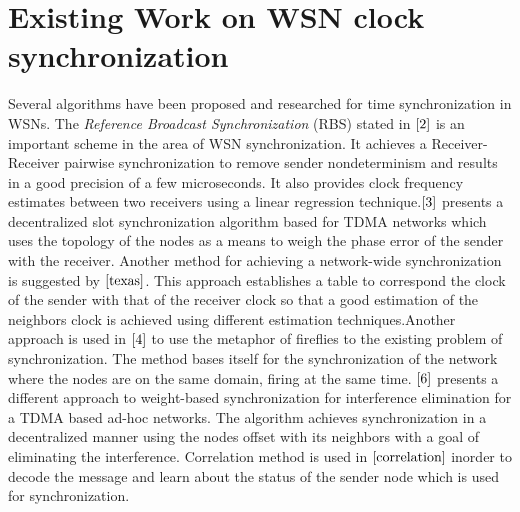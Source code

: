 \documentclass[a4paper,10pt]{report}
\begin{document}
\section{\textbf{Existing Work on WSN clock synchronization}}
\noindent 
Several algorithms have been proposed and researched for time synchronization in WSNs. The \textit{Reference Broadcast Synchronization} (RBS) stated in $\cite{2}$ is an important scheme in the area of WSN synchronization. It achieves a Receiver-Receiver pairwise synchronization to remove sender nondeterminism and results in a good precision of a few microseconds. It also provides clock
frequency estimates between two receivers using a linear regression technique.$\cite{3}$ presents a decentralized slot synchronization algorithm based for TDMA networks which uses the topology of the nodes as a means to weigh the phase error of the sender with the receiver. \newline {} 
Another method for achieving a network-wide synchronization is suggested by $\cite{texas}$. This approach establishes a table to
correspond the clock of the sender with that of the receiver clock so that a good estimation of the neighbors clock is achieved using different estimation techniques.Another approach is used in $\cite{4}$ to use the metaphor of fireflies to the existing problem of synchronization. The method bases itself for the synchronization of the network where the nodes are on the same domain, firing at the same time. $\cite{6}$ presents a different approach to weight-based synchronization for interference elimination for a TDMA based ad-hoc networks. The algorithm achieves synchronization in a decentralized manner using the nodes offset with its neighbors with a goal of eliminating the interference. Correlation method is used in $\cite{correlation}$ inorder to decode the message and learn about the status of the sender node which is used for synchronization.
\end{document}
